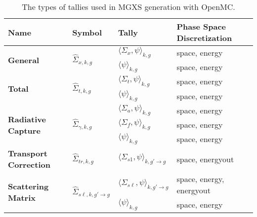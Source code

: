 \begin{table}[h!]
  \centering
  \caption[Tally types for MGXS generation]{The types of tallies used in MGXS generation with OpenMC.}
  \scriptsize
  \label{tab:tally-types}
  \vspace{6pt}
  \begin{tabular}{ m{1.5cm} m{1.2cm} m{2cm} l}
  \toprule
  {\bf Name} &
  {\bf Symbol} &
  {\bf Tally} &
  {\bf Phase Space Discretization} \\

  \midrule

  \multirow{2}{*}{\bf General} & \multirow{2}{*}{$\hat{\Sigma}_{x,k,g}$} & $\langle \Sigma_{x}, \psi \rangle_{k,g}$ & space, energy \\
  \cline{3-4}
  & & $\langle \psi \rangle_{k,g}$ & space, energy \\

  \midrule

  \multirow{2}{*}{\bf Total} & \multirow{2}{*}{$\hat{\Sigma}_{t,k,g}$} & $\langle \Sigma_{t}, \psi \rangle_{k,g}$ & space, energy \\
  \cline{3-4}
  & & $\langle \psi \rangle_{k,g}$ & space, energy \\

  \midrule

  \multirow{3}{*}{\parbox{1.5cm}{\bf Radiative Capture}} & \multirow{3}{*}{$\hat{\Sigma}_{\gamma,k,g}$} & $\langle \Sigma_{a}, \psi \rangle_{k,g}$ & space, energy \\
  \cline{3-4}
  & & $\langle \Sigma_{f}, \psi \rangle_{k,g}$ & space, energy \\
  \cline{3-4}
  & & $\langle \psi \rangle_{k,g}$ & space, energy \\

  \midrule

  \textbf{\parbox{1.5cm}{\bf Transport Correction}} & $\hat{\Sigma}_{tr,k,g}$ & $\langle \Sigma_{s1}, \psi \rangle_{k,g'\rightarrow g}$ & space, energyout \\

  \midrule

  \multirow{2}{*}{\parbox{1.5cm}{\bf Scattering Matrix}} & \multirow{2}{*}{$\hat{\Sigma}_{s\ell,k,g'\rightarrow g}$} & $\langle \Sigma_{s\ell}, \psi \rangle_{k,g'\rightarrow g}$ & space, energy, energyout \\
  \cline{3-4}
  & & $\langle \psi \rangle_{k,g}$ & space, energy \\

  \midrule


\end{tabular}
\end{table}
